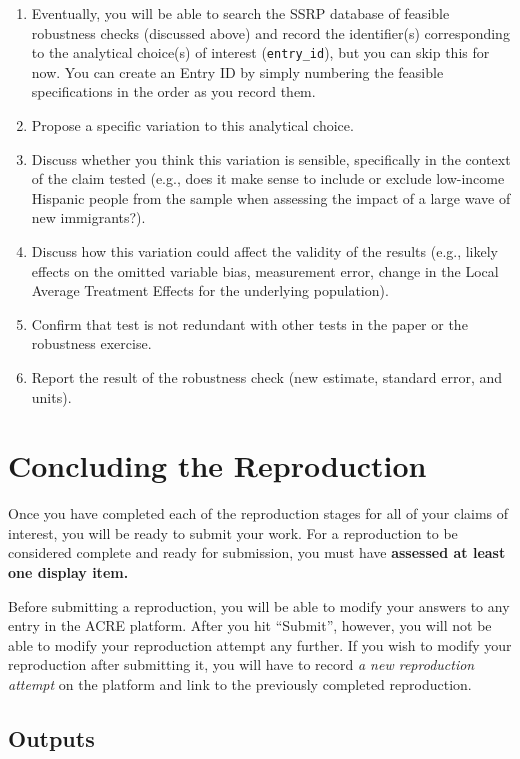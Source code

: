\documentclass[
]{book}
\begin{document}
\begin{enumerate}
\def\labelenumi{\arabic{enumi}.}
\item
  Eventually, you will be able to search the SSRP database of feasible robustness checks (discussed above) and record the identifier(s) corresponding to the analytical choice(s) of interest (\texttt{entry\_id}), but you can skip this for now. You can create an Entry ID by simply numbering the feasible specifications in the order as you record them.
\item
  Propose a specific variation to this analytical choice.
\item
  Discuss whether you think this variation is sensible, specifically in the context of the claim tested (e.g., does it make sense to include or exclude low-income Hispanic people from the sample when assessing the impact of a large wave of new immigrants?).
\item
  Discuss how this variation could affect the validity of the results (e.g., likely effects on the omitted variable bias, measurement error, change in the Local Average Treatment Effects for the underlying population).
\item
  Confirm that test is not redundant with other tests in the paper or the robustness exercise.
\item
  Report the result of the robustness check (new estimate, standard error, and units).
\end{enumerate}

\hypertarget{concluding-the-reproduction}{%
\chapter{Concluding the Reproduction}\label{concluding-the-reproduction}}

Once you have completed each of the reproduction stages for all of your claims of interest, you will be ready to submit your work. For a reproduction to be considered complete and ready for submission, you must have \textbf{assessed at least one display item.}

Before submitting a reproduction, you will be able to modify your answers to any entry in the ACRE platform. After you hit ``Submit'', however, you will not be able to modify your reproduction attempt any further. If you wish to modify your reproduction after submitting it, you will have to record \emph{a new reproduction attempt} on the platform and link to the previously completed reproduction.

\hypertarget{outputs}{%
\section{Outputs}\label{outputs}}
\end{document}
